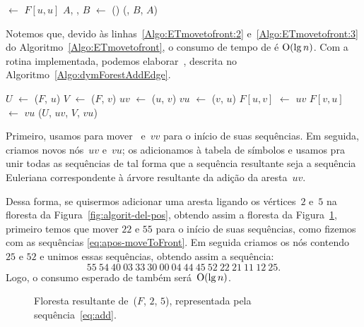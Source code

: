 \begin{algorithm}[htb]
\caption{\ETmovetofront($F$, $u$)}
\label{Algo:ETmovetofront}
\begin{algorithmic}[1]
\State {} $\gets$ $F[u,u]$\label{Algo:ETmovetofront:1}
\State $A$, , $B$ $\gets$ \treapSplit()\label{Algo:ETmovetofront:2}
\State \Return \treapJoin(, $B$, $A$)\label{Algo:ETmovetofront:3}
\end{algorithmic}
\end{algorithm}

Notemos que, devido às linhas~\ref{Algo:ETmovetofront:2} e~\ref{Algo:ETmovetofront:3} do Algoritmo~\ref{Algo:ETmovetofront}, o consumo de tempo de \ETmovetofront{} é $\mathrm{O}(\lg n)$.
Com a rotina \ETmovetofront{} implementada, podemos elaborar~\dymForestAddEdge{}, descrita no Algoritmo~\ref{Algo:dymForestAddEdge}.


\begin{algorithm}[htb]
\caption{\dymForestAddEdge($F$, $u$, $v$)}
\label{Algo:dymForestAddEdge}
\begin{algorithmic}[1]
\State $U$ $\gets$ \ETmovetofront($F$, $u$)
\State $V$ $\gets$ \ETmovetofront($F$, $v$)
\State $uv$ $\gets$ \treapCreate($u$, $v$)
\State $vu$ $\gets$ \treapCreate($v$, $u$)
\State $F[u,v]$ $\gets$ $uv$
\State $F[v,u]$ $\gets$ $vu$
\State \treapJoin($U$, $uv$, $V$, $vu$)
\end{algorithmic}
\end{algorithm}

Primeiro, usamos \ETmovetofront{} para mover~ e~$vv$ para o início de suas sequências.
Em seguida, criamos novos nós~$uv$ e~$vu$; os adicionamos à tabela de símbolos e usamos \treapJoin{} pra unir todas as sequências de tal forma que a sequência resultante seja a sequência Euleriana correspondente à árvore resultante da adição da aresta~$uv$.

Dessa forma, se quisermos adicionar uma aresta ligando os vértices~$2$ e~$5$ na floresta da Figura~\ref{fig:algorit-del-pos}, obtendo assim a floresta da Figura~\ref{fig:algorit-add-pos}, primeiro temos que mover $22$ e $55$ para o início de suas sequências, como fizemos com as sequências \eqref{eq:apos-moveToFront}. Em seguida criamos os nós contendo $25$ e $52$ e unimos essas sequências, obtendo assim a sequência:
\begin{equation}
55~54~40~03~33~30~00~04~44~45~52~22~21~11~12~25.\label{eq:add}
\end{equation}
Logo, o consumo esperado de \dymForestAddEdge{} também será~$\mathrm{O}(\lg n)$.

\begin{figure}[htb]
\centering

\caption{Floresta resultante de~\dymForestAddEdge($F$, $2$, $5$), representada pela sequência~\eqref{eq:add}.}
\label{fig:algorit-add-pos}
\end{figure}
